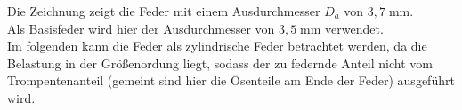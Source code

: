 \begin{center}
\end{center}
\newpage
Die Zeichnung zeigt die Feder mit einem Ausdurchmesser $D_a$ von $3,7\;\text{mm}$.\\ 
Als Basisfeder wird hier der Ausdurchmesser von $3,5\;\text{mm}$ verwendet.\\


Im folgenden kann die Feder als zylindrische Feder betrachtet werden,
da die Belastung in der Größenordung liegt, sodass der zu federnde Anteil nicht 
vom Trompentenanteil (gemeint sind hier die Ösenteile am Ende der Feder)
ausgeführt wird.

\label{sec:Durchfuehrung}